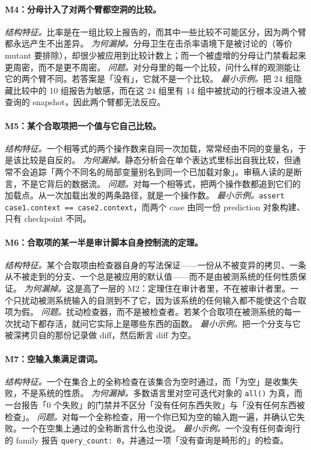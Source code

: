 \documentclass[UTF8,11pt]{ctexart}
\begin{document}
\paragraph{M4：分母计入了对两个臂都空洞的比较。}
\emph{结构特征。}比率是在一组比较上报告的，而其中一些比较不可能区分，因为两个臂都永远产生不出差异。
\emph{为何漏掉。}分母卫生在击杀率语境下是被讨论的（等价 mutant 要排除），却很少被应用到比较计数上；而一个被虚增的分母让门禁看起来更周密，而不是更不周密。
\emph{问题。}对分母里的每一个比较，问什么样的观测能让它的两个臂不同。若答案是「没有」，它就不是一个比较。
\emph{最小示例。}把 24 组隐藏比较中的 10 组报告为敏感，而在这 24 组里有 14 组中被扰动的行根本没进入被查询的 snapshot，因此两个臂都无法反应。

\paragraph{M5：某个合取项把一个值与它自己比较。}
\emph{结构特征。}一个相等式的两个操作数来自同一次加载，常常经由不同的变量名，于是该比较是自反的。
\emph{为何漏掉。}静态分析会在单个表达式里标出自我比较，但通常不会追踪「两个不同名的局部变量别名到同一个已加载对象」。审稿人读的是断言，不是它背后的数据流。
\emph{问题。}对每一个相等式，把两个操作数都追到它们的加载点。从一次加载出发的两条路径，就是一个操作数。
\emph{最小示例。}\texttt{assert case1.context == case2.context}，而两个 case 由同一份 prediction 对象构建、只有 checkpoint 不同。

\paragraph{M6：合取项的某一半是审计脚本自身控制流的定理。}
\emph{结构特征。}某个合取项由检查器自身的写法保证——一份从不被变异的拷贝、一条从不被走到的分支、一个总是被应用的默认值——而不是由被测系统的任何性质保证。
\emph{为何漏掉。}这是高了一层的 M2：定理住在审计者里，不在被审计者里。一个只扰动被测系统输入的自测到不了它，因为该系统的任何输入都不能使这个合取项为假。
\emph{问题。}扰动检查器，而不是被检查者。若某个合取项在被测系统的每一次扰动下都存活，就问它实际上是哪些东西的函数。
\emph{最小示例。}把一个分支与它被深拷贝自的那份记录做 diff，然后断言 diff 为空。

\paragraph{M7：空输入集满足谓词。}
\emph{结构特征。}一个在集合上的全称检查在该集合为空时通过，而「为空」是收集失败，不是系统的性质。
\emph{为何漏掉。}多数语言里对空可迭代对象的 \texttt{all()} 为真，而一台报告「0 个失败」的门禁并不区分「没有任何东西失败」与「没有任何东西被检查」。
\emph{问题。}对每一个全称检查，用一个你已知为空的输入跑一遍，并确认它失败。一个在空集上通过的全称断言什么也没说。
\emph{最小示例。}一个没有任何查询行的 family 报告 \texttt{query\_count: 0}，并通过一项「没有查询是畸形的」的检查。
\end{document}
